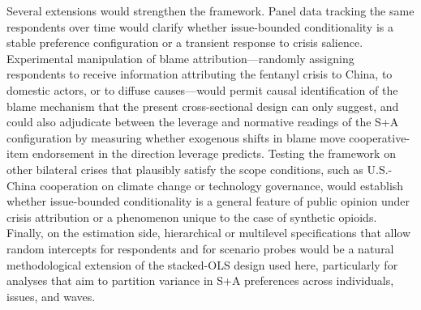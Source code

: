 \documentclass[12pt,letterpaper]{article}
\begin{document}
Several extensions would strengthen the framework. Panel data tracking the same respondents over time would clarify whether issue-bounded conditionality is a stable preference configuration or a transient response to crisis salience. Experimental manipulation of blame attribution---randomly assigning respondents to receive information attributing the fentanyl crisis to China, to domestic actors, or to diffuse causes---would permit causal identification of the blame mechanism that the present cross-sectional design can only suggest, and could also adjudicate between the leverage and normative readings of the S+A configuration by measuring whether exogenous shifts in blame move cooperative-item endorsement in the direction leverage predicts. Testing the framework on other bilateral crises that plausibly satisfy the scope conditions, such as U.S.-China cooperation on climate change or technology governance, would establish whether issue-bounded conditionality is a general feature of public opinion under crisis attribution or a phenomenon unique to the case of synthetic opioids. Finally, on the estimation side, hierarchical or multilevel specifications that allow random intercepts for respondents and for scenario probes would be a natural methodological extension of the stacked-OLS design used here, particularly for analyses that aim to partition variance in S+A preferences across individuals, issues, and waves.

\printbibliography
\end{document}

